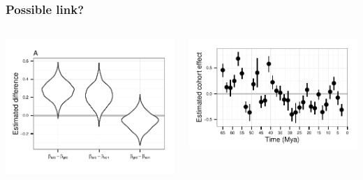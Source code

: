 \documentclass{beamer}
\begin{document}
\begin{frame}
  \frametitle{Possible link?}
  \begin{columns}
    \begin{column}{0.55\textwidth}
      \includegraphics[width=\textwidth,height=0.8\textheight,keepaspectratio=true]{figure/loco_diff_est}
    \end{column}
    \begin{column}{0.55\textwidth}
      \includegraphics[width=\textwidth,height=\textheight,keepaspectratio=true]{figure/cohort_est}
    \end{column}
  \end{columns}
  
\end{frame}
\end{document}
